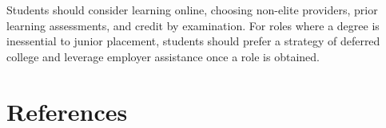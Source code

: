 \documentclass[review]{elsarticle}
\begin{document}
        Students should consider learning online, choosing non-elite providers,
        prior learning assessments, and credit by examination.
        For roles where a degree is inessential to junior placement, students should prefer a strategy of
        deferred college and leverage employer assistance once a role is obtained.

        \section*{References}
        
        
        
        
\end{document}
